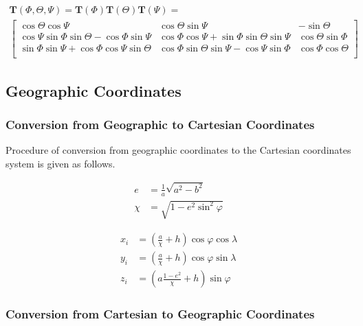 \begin{equation}
  \begin{array}{c}
  \boldsymbol T \left( \Phi,\Theta,\Psi \right) =
  \boldsymbol T \left( \Phi \right)
  \boldsymbol T \left( \Theta \right) 
  \boldsymbol T \left( \Psi \right) = \\
  \left[
    \begin{matrix}
       \cos \Theta \cos \Psi &
       \cos \Theta \sin \Psi &
      -\sin \Theta \\
       \cos \Psi   \sin \Phi   \sin \Theta - \cos \Phi   \sin \Psi &
       \cos \Phi   \cos \Psi + \sin \Phi     \sin \Theta \sin \Psi &
       \cos \Theta \sin \Phi \\
       \sin \Phi   \sin \Psi + \cos \Phi     \cos \Psi   \sin \Theta &
       \cos \Phi   \sin \Theta \sin \Psi   - \cos \Psi   \sin \Phi &
       \cos \Phi   \cos \Theta \\
    \end{matrix}
  \right]
  \end{array}
\end{equation}

\subsection{Geographic Coordinates}

\subsubsection{Conversion from Geographic to Cartesian Coordinates}

Procedure of conversion from geographic coordinates to the Cartesian coordinates system is given as follows.

\begin{align}
  e    &= \frac{1}{a} \sqrt{a^2-b^2} \\
  \chi &= \sqrt{ 1 - e^2 \sin^2 \varphi }
\end{align}

\begin{align}
  x_i &= \left( \frac{a}{\chi} + h \right) \cos \varphi \cos \lambda \\
  y_i &= \left( \frac{a}{\chi} + h \right) \cos \varphi \sin \lambda \\
  z_i &= \left( a \frac{1-e^2}{\chi} + h \right) \sin \varphi
\end{align}

\subsubsection{Conversion from Cartesian to Geographic Coordinates}

